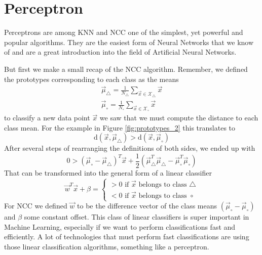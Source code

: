 \chapter{Perceptron}
\label{ch:perceptron}
Perceptrons are among KNN and NCC one of the simplest, yet powerful and popular algorithms. They are the easiest form of Neural Networks
that we know of and are a great introduction into the field of Artificial Neural Networks.

But first we make a small recap of the NCC algorithm. Remember, we defined the prototypes corresponding to each class as the means
\begin{align}
  \vec{\mu}_{\triangle} = \frac{1}{N_{\triangle}} \sum_{\vec{x} \in \mathcal{X}_{\triangle}} \vec{x}\\
  \vec{\mu}_{\circ} = \frac{1}{N_{\circ}} \sum_{\vec{x} \in \mathcal{X}_{\circ}} \vec{x}
\end{align}
to classify a new data point $\vec{x}$ we saw that we must compute the distance to each class mean.
For the example in Figure \ref{fig:prototypes_2} this translates to
\begin{equation}
  \text{d}(\vec{x}, \vec{\mu}_{\triangle}) > \text{d}(\vec{x}, \vec{\mu}_{\circ})
\end{equation}
After several steps of rearranging the definitions of both sides, we ended up with
\begin{equation}
  0 > \left(\vec{\mu}_{\circ} - \vec{\mu}_{\triangle}\right)^T \vec{x} + \frac{1}{2} \left(\vec{\mu}_{\triangle}^T \vec{\mu}_{\triangle} - \vec{\mu}_{\circ}^T \vec{\mu}_{\circ}\right)
\end{equation}
That can be transformed into the general form of a linear classifier
\begin{equation}
  \vec{w}^T \vec{x} + \beta = \left\{\begin{matrix}
    > 0 \text{ if } \vec{x} \text{ belongs to class } \triangle\\
    < 0 \text{ if } \vec{x} \text{ belongs to class } \circ
  \end{matrix}\right.
\end{equation}
For NCC we defined $\vec{w}$ to be the difference vector of the class means $\left(\vec{\mu}_{\circ} - \vec{\mu}_{\circ}\right)$ and $\beta$ some constant offset.
This class of linear classifiers is super important in Machine Learning, especially if we want to perform classifications fast and efficiently. A lot of technologies that must perform
fast classifications are using those linear classification algorithms, something like a perceptron.

